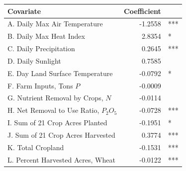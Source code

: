 \documentclass[paperwidth=42in,paperheight=44in,fontscale=0.31]{baposter}
\begin{document}
\begin{poster}
{\begin{center}
\begin{tabular}{l r l}
\toprule
\textbf{Covariate} & \textbf{Coefficient} & \\
\midrule
A. Daily Max Air Temperature \cite{nldas} & -1.2558  &  *** \\ %
B. Daily Max Heat Index \cite{nldas} &  2.8354  &  * \\ %
C. Daily Precipitation  \cite{nldas} &  0.2645  &  *** \\ %
D. Daily Sunlight   \cite{nldas}  & 0.7585  &  \\ %
E. Day Land Surface Temperature \cite{modis} &  -0.0792   &  *  \\ %
F. Farm Inputs, Tons $P$ \cite{nuGIS} & -0.0009 \\ %
G. Nutrient Removal by Crops, $N$ \cite{nuGIS} & -0.0114  &  \\   %
H. Net Removal to Use Ratio, $P_2 O_5$  \cite{nuGIS} & -0.0728  &  *** \\ %
I. Sum of 21 Crop Acres Planted  \cite{nuGIS} & -0.1951   &  * \\ 
J. Sum of 21 Crop Acres Harvested  \cite{nuGIS} &  0.3774  &  *** \\
K. Total Cropland \cite{nuGIS} & -0.1531  &  *** \\%
L. Percent Harvested Acres, Wheat               & -0.0122 &  *** \\ %
\bottomrule
\end{tabular}
\label{coeftable}
\end{center}






}



\end{poster}
\end{document}
